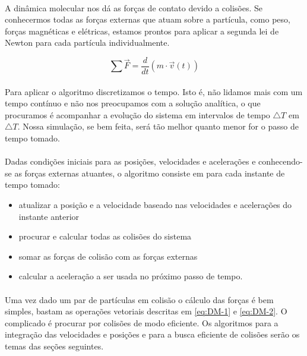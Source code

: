 \documentclass[a4paper,11pt]{article}
\begin{document}
    \paragraph{}A dinâmica molecular nos dá as forças de
    contato devido a colisões. Se conhecermos todas as
    forças externas que atuam sobre a partícula, como peso,
    forças magnéticas e elétricas, estamos
    prontos para aplicar a segunda lei de Newton para cada
    partícula individualmente. 
    
 \begin{equation}
        \sum \vec{F} = \frac{d}{dt} ( m \cdot \vec{v}(t) )
    \end{equation} 
\FloatBarrier

\paragraph{} Para aplicar o algoritmo discretizamos o tempo.
Isto é, não lidamos mais com um tempo contínuo e não nos
preocupamos com a solução analítica, o que procuramos é
acompanhar a evolução do sistema em intervalos de tempo 
$\triangle T$ em $\triangle T$. Nossa simulação, se bem
feita, será tão melhor quanto menor for o passo de tempo
tomado.

\paragraph{}Dadas condições
iniciais para as posições, velocidades e acelerações e
conhecendo-se 
as forças externas atuantes, o algoritmo consiste em para cada
instante de tempo tomado:
\begin{itemize}
  \item atualizar a posição e a velocidade baseado nas
    velocidades e acelerações do instante anterior
  \item procurar e calcular todas as colisões do sistema
  \item somar as forças de colisão com as forças externas
  \item calcular a aceleração a ser usada no próximo passo
    de tempo.
\end{itemize}

\paragraph{} Uma vez dado um par de partículas em colisão o
cálculo das forças é bem simples, bastam as operações
vetoriais descritas em \ref{eq:DM-1} e \ref{eq:DM-2}. O complicado é procurar
por colisões de modo eficiente. Os algoritmos para a
integração das velocidades e posições e para a busca
eficiente de
colisões serão os temas das seções seguintes. 
\end{document}
